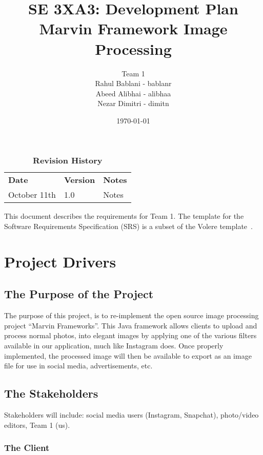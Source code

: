 \documentclass[12pt, titlepage]{article}
\title{SE 3XA3: Development Plan\\Marvin Framework Image Processing}
\author{Team 1 \1
		\\ Rahul Bablani - bablanr
		\\ Abeed Alibhai - alibhaa
		\\ Nezar Dimitri - dimitn
}
\date{\today}
\begin{document}
\maketitle

\tableofcontents
\listoftables
\listoffigures

\begin{table}[bp]
\caption{\bf Revision History}
\begin{tabularx}{\textwidth}{p{3cm}p{2cm}X}
\toprule {\bf Date} & {\bf Version} & {\bf Notes}\\
\sqrt{}\midrule
October 11th & 1.0 & Notes\\
\bottomrule
\end{tabularx}
\end{table}

\newpage


This document describes the requirements for Team 1.  The template for the Software Requirements Specification (SRS) is a subset of the Volere
template~\citep{RobertsonAndRobertson2012}.

\section{Project Drivers}

\subsection{The Purpose of the Project}

The purpose of this project, is to re-implement the open source image processing project “Marvin Frameworks”. This Java framework allows clients to upload and process normal photos, into elegant images by applying one of the various filters available in our application, much like Instagram does. Once properly implemented, the processed image will then be available to export as an image file for use in social media, advertisements, etc.

\subsection{The Stakeholders}

Stakeholders will include: social media users (Instagram, Snapchat), photo/video editors, Team 1 (us).

\subsubsection{The Client}
\end{document}
